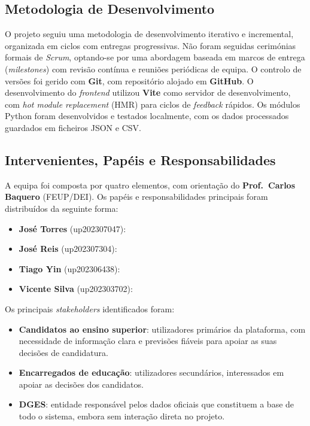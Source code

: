 \documentclass[12pt,a4paper]{article}
\begin{document}
\subsection{Metodologia de Desenvolvimento}

O projeto seguiu uma metodologia de desenvolvimento iterativo e incremental, organizada em ciclos com entregas progressivas. Não foram seguidas cerimónias formais de \textit{Scrum}, optando-se por uma abordagem baseada em marcos de entrega (\textit{milestones}) com revisão contínua e reuniões periódicas de equipa. O controlo de versões foi gerido com \textbf{Git}, com repositório alojado em \textbf{GitHub}. O desenvolvimento do \textit{frontend} utilizou \textbf{Vite} como servidor de desenvolvimento, com \textit{hot module replacement} (HMR) para ciclos de \textit{feedback} rápidos. Os módulos Python foram desenvolvidos e testados localmente, com os dados processados guardados em ficheiros JSON e CSV.

\subsection{Intervenientes, Papéis e Responsabilidades}

A equipa foi composta por quatro elementos, com orientação do \textbf{Prof.\ Carlos Baquero} (FEUP/DEI). Os papéis e responsabilidades principais foram distribuídos da seguinte forma:

\begin{itemize}[noitemsep]
  \item \textbf{José Torres} (up202307047): 
  \item \textbf{José Reis} (up202307304):
  \item \textbf{Tiago Yin} (up202306438): 
  \item \textbf{Vicente Silva} (up202303702):
\end{itemize}

Os principais \textit{stakeholders} identificados foram:

\begin{itemize}[noitemsep]
  \item \textbf{Candidatos ao ensino superior}: utilizadores primários da plataforma, com necessidade de informação clara e previsões fiáveis para apoiar as suas decisões de candidatura.
  \item \textbf{Encarregados de educação}: utilizadores secundários, interessados em apoiar as decisões dos candidatos.
  \item \textbf{DGES}: entidade responsável pelos dados oficiais que constituem a base de todo o sistema, embora sem interação direta no projeto.
\end{itemize}
\end{document}

